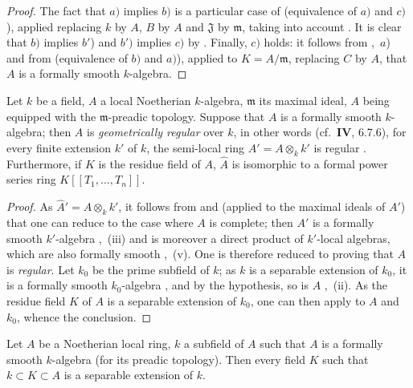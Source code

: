 \begin{proof}
The fact that $a)$ implies $b)$ is a particular case of  (equivalence of $a)$ and $c)$), applied replacing $k$ by $A$, $B$ by $A$ and $\mathfrak{J}$ by $\mathfrak{m}$, taking into account .
It is clear that $b)$ implies $b'$) and $b')$ implies $c)$ by .
Finally, $c)$ holds: it follows from ,~$a$) and from  (equivalence of $b)$ and $a)$), applied to $K=A/\mathfrak{m}$, replacing $C$ by $A$, that $A$ is a formally smooth $k$-algebra.
\end{proof}

\begin{corollary}[19.6.5]
\label{0.19.6.5}
Let $k$ be a field, $A$ a local Noetherian $k$-algebra, $\mathfrak{m}$ its maximal ideal, $A$ being equipped with the $\mathfrak{m}$-preadic topology.
Suppose that $A$ is a formally smooth $k$-algebra;
then $A$ is \emph{geometrically regular} over $k$, in other words (cf.~$\mathbf{IV}$, 6.7.6), for every finite extension $k'$ of $k$, the semi-local ring $A'=A\otimes_k k'$ is regular .
Furthermore, if $K$ is the residue field of $A$, $\widehat{A}$ is isomorphic to a formal power series ring $K[[T_1,\ldots,T_n]]$.
\end{corollary}

\begin{proof}
As $\widehat{A}'=\widehat{A}\otimes_k k'$, it follows from  and  (applied to the maximal ideals of $A'$) that one can reduce to the case where $A$ is complete;
then $A'$ is a formally smooth $k'$-algebra ,~(iii) and is moreover a direct product of $k'$-local algebras, which are also formally smooth ,~(v).
One is therefore reduced to proving that $A$ is \emph{regular}.
Let $k_0$ be the prime subfield of $k$;
as $k$ is a separable extension of $k_0$, it is a formally smooth $k_0$-algebra , and by the hypothesis, so is $A$ ,~(ii).
As the residue field $K$ of $A$ is a separable extension of $k_0$, one can then apply  to $A$ and $k_0$, whence the conclusion.
\end{proof}

\begin{corollary}[19.6.5.1]
\label{0.19.6.5.1}
Let $A$ be a Noetherian local ring, $k$ a subfield of $A$ such that $A$ is a formally smooth $k$-algebra (for its preadic topology).
Then every field $K$ such that $k\subset K\subset A$ is a separable extension of $k$.
\end{corollary}

